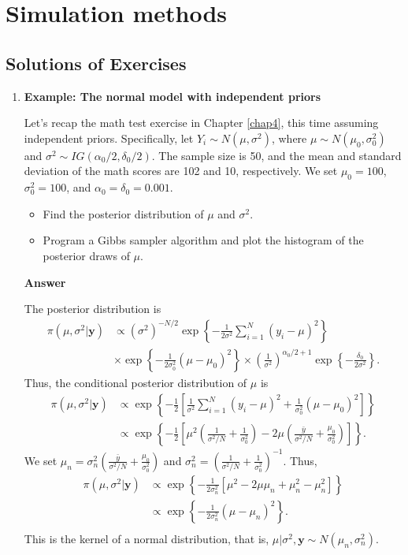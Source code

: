 \chapter{Simulation methods}\label{chap5}

\section*{Solutions of Exercises}\label{sec51}
\begin{enumerate}[leftmargin=*]
\item \textbf{Example: The normal model with independent priors}

Let's recap the math test exercise in Chapter \ref{chap4}, this time assuming independent priors. Specifically, let $Y_i \sim N(\mu, \sigma^2)$, where $\mu \sim N(\mu_0, \sigma_0^2)$ and $\sigma^2 \sim IG(\alpha_0 / 2, \delta_0 / 2)$. The sample size is 50, and the mean and standard deviation of the math scores are 102 and 10, respectively. We set $\mu_0 = 100$, $\sigma_0^2 = 100$, and $\alpha_0 = \delta_0 = 0.001$.

\begin{itemize}
	\item Find the posterior distribution of $\mu$ and $\sigma^2$.
	\item Program a Gibbs sampler algorithm and plot the histogram of the posterior draws of $\mu$.
\end{itemize}

\textbf{Answer}

The posterior distribution is
\begin{align*}
	\pi(\mu,\sigma^2|\bm{y})&\propto (\sigma^2)^{-N/2}\exp\left\{-\frac{1}{2\sigma^2}\sum_{i=1}^N(y_i-\mu)^2\right\}\\
	&\times \exp\left\{-\frac{1}{2\sigma^2_0}(\mu-\mu_0)^2\right\}\times \left(\frac{1}{\sigma^2}\right)^{\alpha_0/2+1}\exp\left\{-\frac{\delta_0}{2\sigma^2}\right\}.
\end{align*}
Thus, the conditional posterior distribution of $\mu$ is
\begin{align*}
	\pi(\mu,\sigma^2|\bm{y})&\propto \exp\left\{-\frac{1}{2}\left[\frac{1}{\sigma^2}\sum_{i=1}^N(y_i-\mu)^2+\frac{1}{\sigma^2_0}(\mu-\mu_0)^2\right]\right\}\\
	&\propto \exp\left\{-\frac{1}{2}\left[\mu^2\left(\frac{1}{\sigma^2/N}+\frac{1}{\sigma^2_0}\right)-2\mu\left(\frac{\bar{y}}{\sigma^2/N}+\frac{\mu_0}{\sigma_0^2}\right)\right]\right\}.  
\end{align*} 
We set $\mu_n=\sigma^{2}_n\left(\frac{\bar{y}}{\sigma^2/N}+\frac{\mu_0}{\sigma_0^2}\right)$ and $\sigma^{2}_n=\left(\frac{1}{\sigma^2/N}+\frac{1}{\sigma_0^2}\right)^{-1}$. Thus,
\begin{align*}
	\pi(\mu,\sigma^2|\bm{y})&\propto \exp\left\{-\frac{1}{2\sigma_n^2}\left[\mu^2-2\mu\mu_n+\mu_n^2-\mu_n^2\right]\right\}\\
	&\propto \exp\left\{-\frac{1}{2\sigma_n^2}(\mu-\mu_n)^2\right\}.\\  
\end{align*} 
This is the kernel of a normal distribution, that is, $\mu|\sigma^2,\bm{y}\sim N(\mu_n,\sigma_n^2)$.


\end{enumerate}
